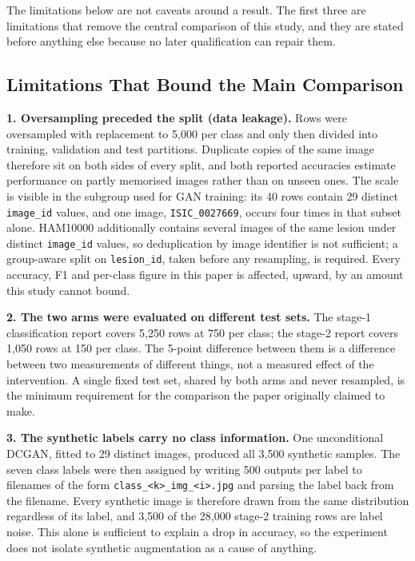 \documentclass[ai,article,submit,pdftex,moreauthors]{Definitions/mdpi}
\begin{document}
The limitations below are not caveats around a result. The first three are limitations that remove the central comparison of this study, and they are stated before anything else because no later qualification can repair them.

\subsection{Limitations That Bound the Main Comparison}

\textbf{1. Oversampling preceded the split (data leakage).} Rows were oversampled with replacement to 5,000 per class and only then divided into training, validation and test partitions. Duplicate copies of the same image therefore sit on both sides of every split, and both reported accuracies estimate performance on partly memorised images rather than on unseen ones. The scale is visible in the subgroup used for GAN training: its 40 rows contain 29 distinct \texttt{image\_id} values, and one image, \texttt{ISIC\_0027669}, occurs four times in that subset alone. HAM10000 additionally contains several images of the same lesion under distinct \texttt{image\_id} values, so deduplication by image identifier is not sufficient; a group-aware split on \texttt{lesion\_id}, taken before any resampling, is required. Every accuracy, F1 and per-class figure in this paper is affected, upward, by an amount this study cannot bound.

\textbf{2. The two arms were evaluated on different test sets.} The stage-1 classification report covers 5,250 rows at 750 per class; the stage-2 report covers 1,050 rows at 150 per class. The 5-point difference between them is a difference between two measurements of different things, not a measured effect of the intervention. A single fixed test set, shared by both arms and never resampled, is the minimum requirement for the comparison the paper originally claimed to make.

\textbf{3. The synthetic labels carry no class information.} One unconditional DCGAN, fitted to 29 distinct images, produced all 3,500 synthetic samples. The seven class labels were then assigned by writing 500 outputs per label to filenames of the form \texttt{class\_<k>\_img\_<i>.jpg} and parsing the label back from the filename. Every synthetic image is therefore drawn from the same distribution regardless of its label, and 3,500 of the 28,000 stage-2 training rows are label noise. This alone is sufficient to explain a drop in accuracy, so the experiment does not isolate synthetic augmentation as a cause of anything.
\end{document}
